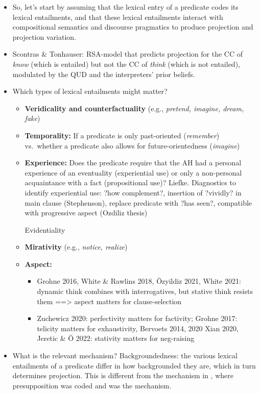 \documentclass[11pt,fleqn]{article}
\newcommand{\6}{\mbox{$[\hspace*{-.6mm}[$}}
\newcommand{\9}{\mbox{$]\hspace*{-.6mm}]$}}
\begin{document}
\begin{itemize}[leftmargin=12pt]
\item So, let's start by assuming that the lexical entry of a predicate codes its lexical entailments, and that these lexical entailments interact with compositional semantics and discourse pragmatics to produce projection and projection variation.

\item Scontras \& Tonhauser: RSA-model that predicts projection for the CC of {\em know} (which is entailed) but not the CC of {\em think} (which is not entailed), modulated by the QUD and the interpreters' prior beliefs.

\item Which types of lexical entailments might matter?

\begin{itemize}

\item {\bf Veridicality and counterfactuality} (e.g., {\em pretend, imagine, dream, fake})

\item {\bf Temporality:} If a predicate is only past-oriented ({\em remember}) vs.\ whether a predicate also allows for future-orientedness ({\em imagine})

\item {\bf Experience:} Does the predicate require that the AH had a personal experience of an eventuality (experiential use) or only a non-personal acquaintance with a fact (propositional use)? Liefke. Diagnostics to identify experiential use: ?how complement?, insertion of ?vividly? in main clause (Stephenson), replace predicate with ?has seen?, compatible with progressive aspect (Ozdiliz thesis)

Evidentiality

\item {\bf Mirativity} (e.g., {\em notice, realize})

\item {\bf Aspect:} 

\begin{itemize}

\item Grohne 2016, White \& Rawlins 2018, \"Ozyildiz 2021, White 2021: dynamic think combines with interrogatives, but stative think resists them ==> aspect matters for clause-selection

\item Zuchewicz 2020: perfectivity matters for factivity; Grohne 2017: telicity matters for exhaustivity, Bervoets 2014, 2020 Xian 2020, Jeretic \& \"O 2022: stativity matters for neg-raising

\end{itemize}

\end{itemize}

\item What is the relevant mechanism? Backgroundedness: the various lexical entailments of a predicate differ in how backgrounded they are, which in turn determines projection. This is different from the mechanism in \citealt{heim83}, where presupposition was coded and was the mechanism.

\end{itemize}



\end{document}
